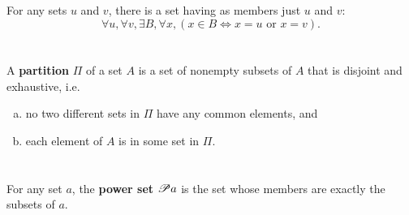 \documentclass{report}
\begin{document}
\section{}%

For any sets $u$ and $v$, there is a set having as members just $u$ and $v$:
  $$\forall u, \forall v, \exists B, \forall x,
      (x \in B \iff x = u \text{ or } x = v).$$

\begin{axiom}

  \statementpadding



\end{axiom}

\section{}%

A \textbf{partition} $\Pi$ of a set $A$ is a set of nonempty subsets of $A$ that
  is disjoint and exhaustive, i.e.
  \begin{enumerate}[(a)]
    \item no two different sets in $\Pi$ have any common elements, and
    \item each element of $A$ is in some set in $\Pi$.
  \end{enumerate}

\begin{definition}


\end{definition}

\section{}%

For any set $a$, the \textbf{power set $\mathscr{P}a$} is the set whose members
  are exactly the subsets of $a$.

\begin{definition}


\end{definition}
\end{document}
